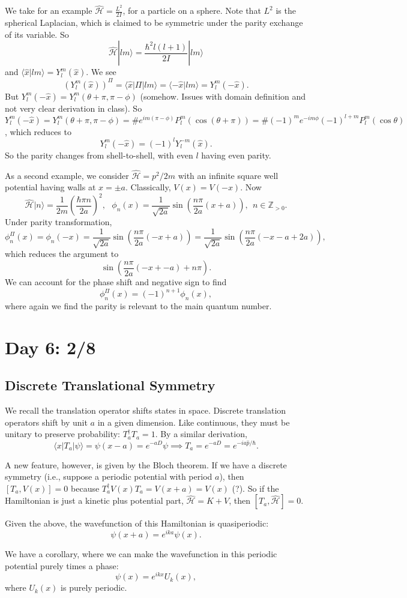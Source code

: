 \documentclass[fontsize=12pt]{scrartcl}
\newcommand{\bb}[1]{\mathbb{#1}}
\newcommand{\la}{\langle}
\newcommand{\ra}{\rangle}
\newcommand{\mom}{\hat{p}}
\newcommand{\Ham}{\hat{\mathcal{H}}}
\begin{document}
We take for an example $\Ham=\frac{L^2}{2I}$, for a particle on a sphere. Note that $L^2$ is the spherical Laplacian, which is claimed to be symmetric under the parity exchange of its variable. So $$\Ham|lm\ra = \frac{\hbar^2l(l+1)}{2I}|lm\ra$$ and $\la \hat{x}|lm\ra = Y_l^m(\hat{x})$. We see $$\left(Y_l^m(\hat{x})\right)^\Pi = \la \hat{x}|\Pi|lm\ra = \la -\hat{x}|lm\ra=Y_l^m(-\hat{x}).$$ But $Y_l^m(-\hat{x})=Y_l^m(\theta+\pi,\pi-\phi)$ (somehow. Issues with domain definition and not very clear derivation in class). So $$Y_l^m(-\hat{x})=Y_l^m(\theta+\pi,\pi-\phi)=\# e^{im(\pi-\phi)}P_l^m(\cos(\theta+\pi))=\# (-1)^me^{-im\phi}(-1)^{l+m}P_l^m(\cos\theta)$$, which reduces to $$Y_l^m(-\hat{x})=(-1)^lY_l^{-m}(\hat{x}).$$ So the parity changes from shell-to-shell, with even $l$ having even parity.

As a second example, we consider $\Ham=p^2/2m$ with an infinite square well potential having walls at $x=\pm a$. Classically, $V(x)=V(-x)$. Now $$\Ham|n\ra = \frac{1}{2m}\left(\frac{\hbar\pi n}{2a}\right)^2, \ \ \ \phi_n(x)=\frac{1}{\sqrt{2a}} \sin\left(\frac{n\pi}{2a}(x+a)\right), \ \ n\in \bb{Z}_{>0}.$$ Under parity transformation, $$\phi_n^\Pi(x)=\phi_n(-x)=\frac{1}{\sqrt{2a}}\sin\left(\frac{n\pi}{2a}(-x+a)\right)=\frac{1}{\sqrt{2a}}\sin\left(\frac{n\pi}{2a}(-x-a+2a)\right),$$ which reduces the argument to $$\sin\left(\frac{n\pi}{2a}(-x+-a)+n\pi\right).$$ We can account for the phase shift and negative sign to find $$\phi_n^\Pi(x)=(-1)^{n+1}\phi_n(x),$$ where again we find the parity is relevant to the main quantum number.

\section{Day 6: 2/8}

\subsection{Discrete Translational Symmetry}

We recall the translation operator shifts states in space. Discrete translation operators shift by unit $a$ in a given dimension. Like continuous, they must be unitary to preserve probability: $T_a^\dagger T_a=1$. By a similar derivation, $$\la x|T_a|\psi\ra = \psi(x-a)=e^{-aD}\psi\implies T_a=e^{-aD}=e^{-ia\mom/\hbar}.$$

A new feature, however, is given by the Bloch theorem. If we have a discrete symmetry (i.e., suppose a periodic potential with period $a$), then $[T_a,V(x)]=0$ because $T_a^\dagger V(x)T_a=V(x+a)=V(x)$ (?). So if the Hamiltonian is just a kinetic plus potential part, $\Ham=K+V$, then $[T_a,\Ham]=0$. \begin{mdframed}
	Given the above, the wavefunction of this Hamiltonian is quasiperiodic: $$\psi(x+a)=e^{ika}\psi(x).$$
\end{mdframed} We have a corollary, where we can make the wavefunction in this periodic potential purely times a phase: $$\psi(x)=e^{ikx}U_k(x),$$ where $U_k(x)$ is purely periodic.
\end{document}
